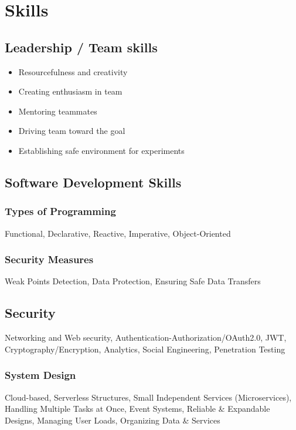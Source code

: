 \section*{Skills}

\subsection*{Leadership / Team skills}

\begin{itemize}[noitemsep, nosep]
  \item Resourcefulness and creativity
  \item Creating enthusiasm in team
  \item Mentoring teammates
  \item Driving team toward the goal
  \item Establishing safe environment for experiments
\end{itemize}

\subsection*{Software Development Skills}

\subsubsection*{Types of Programming}
Functional, Declarative, Reactive, Imperative, Object-Oriented

\subsubsection*{Security Measures}
Weak Points Detection, Data Protection, Ensuring Safe Data Transfers

\subsection*{Security}
Networking and Web security, Authentication-Authorization/OAuth2.0, JWT, Cryptography/Encryption, Analytics, Social Engineering, Penetration Testing

\subsubsection*{System Design}
Cloud-based, Serverless Structures, Small Independent Services (Microservices), Handling Multiple Tasks at Once, Event Systems, Reliable \& Expandable Designs, Managing User Loads, Organizing Data \& Services

